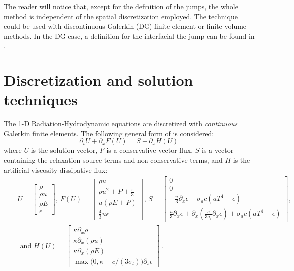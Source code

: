 \documentclass[times]{fldauth}
\begin{document}
%
 \begin{remark}
The reader will notice that, except for the definition of the jumps, the whole method is independent of the spatial discretization employed. The technique could be used with discontinuous Galerkin (DG) finite element or finite volume methods. In the DG case, a definition for the interfacial the jump can be found in \cite{valentin}.
 \end{remark}
%
\section{Discretization and solution techniques}
\label{sec:discr}
%
The 1-D Radiation-Hydrodynamic equations  are discretized with \emph{continuous} Galerkin finite elements. 
The following general form of  is considered:
\begin{equation}
\label{eq:form}
\partial_t U + \partial_x F \left( U \right) = S + \partial_x H \left(U\right) \,
\end{equation}
where $U$ is the solution vector, $F$ is a conservative vector flux, $S$ is a vector containing the relaxation source terms and non-conservative terms, and $H$ is the artificial viscosity dissipative flux:
\begin{eqnarray*}
&&U = 
\begin{bmatrix}
\rho \\
\rho u \\
\rho E \\
\epsilon
\end{bmatrix}
,\
F(U) = 
\begin{bmatrix}
\rho u \\
\rho u^2 + P + \frac{\epsilon}{3} \\
u \left( \rho E + P \right) \\
\frac{4}{3} u \epsilon
\end{bmatrix}
,\ 
S = 
\begin{bmatrix}
0 \\
0 \\
-\frac{u}{3} \partial_x \epsilon - \sigma_a c \left( a T^4 - \epsilon \right) \\
\frac{u}{3} \partial_x \epsilon + \partial_x \left( \frac{c}{3 \sigma_t} \partial_x \epsilon \right) + \sigma_a c \left( a T^4 - \epsilon \right)
\end{bmatrix}
,
\\
&&\text{ and } 
H(U) = 
\begin{bmatrix}
\kappa \partial_x \rho \\
\kappa \partial_x (\rho u) \\
\kappa \partial_x \left( \rho E \right)\\
\max \big( 0, \kappa- c/(3 \sigma_t) \big) \partial_x \epsilon 
\end{bmatrix} \,.
\end{eqnarray*}
\end{document}

